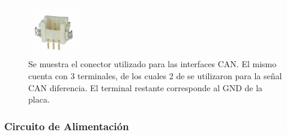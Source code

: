 
\begin{figure}[htb]
    \centering
    \includegraphics[width=0.2\textwidth]{img/conector_CAN.jpg}    
    \caption{Se muestra el conector utilizado para las interfaces CAN. El mismo cuenta con 3 terminales, de los cuales 2 de se utilizaron para la señal CAN diferencia. El terminal restante corresponde al GND de la placa.}
    \label{fig:conector_CAN}
\end{figure}






\subsubsection{Circuito de Alimentación}\label{sec:circuito_de_alimentacion}

